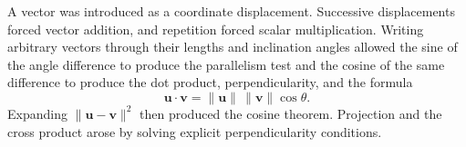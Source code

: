 \begin{summarybox}
A vector was introduced as a coordinate displacement. Successive displacements
forced vector addition, and repetition forced scalar multiplication. Writing
arbitrary vectors through their lengths and inclination angles allowed the sine
of the angle difference to produce the parallelism test and the cosine of the
same difference to produce the dot product, perpendicularity, and the formula
\[
\mathbf u\cdot\mathbf v
=
\|\mathbf u\|\,\|\mathbf v\|\cos\theta.
\]
Expanding $\|\mathbf u-\mathbf v\|^2$ then produced the cosine theorem. Projection
and the cross product arose by solving explicit perpendicularity conditions.
\end{summarybox}
